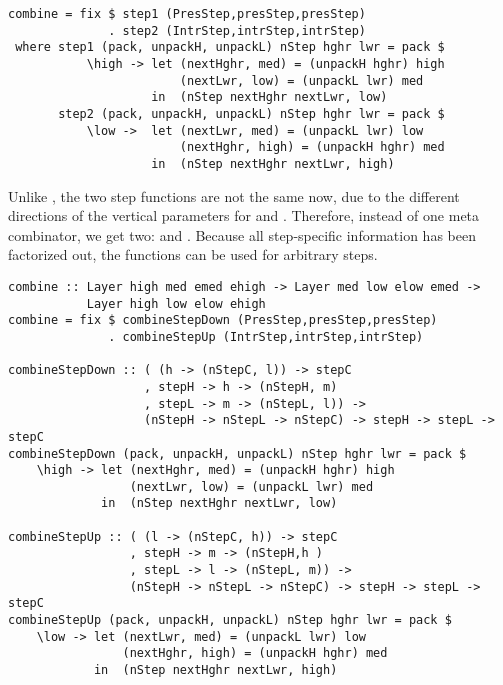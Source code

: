 \begin{small}
\begin{verbatim}
combine = fix $ step1 (PresStep,presStep,presStep) 
              . step2 (IntrStep,intrStep,intrStep) 
 where step1 (pack, unpackH, unpackL) nStep hghr lwr = pack $
           \high -> let (nextHghr, med) = (unpackH hghr) high
                        (nextLwr, low) = (unpackL lwr) med
                    in  (nStep nextHghr nextLwr, low)
       step2 (pack, unpackH, unpackL) nStep hghr lwr = pack $
           \low ->  let (nextLwr, med) = (unpackL lwr) low
                        (nextHghr, high) = (unpackH hghr) med
                    in  (nStep nextHghr nextLwr, high)
\end{verbatim}
\end{small}

Unlike , the two step functions are not the same now, due to the different directions of the vertical parameters for  and . Therefore, instead of one meta combinator, we get two:  and . Because all step-specific information has been factorized out, the functions can be used for arbitrary steps.

\begin{small}
\begin{verbatim}
combine :: Layer high med emed ehigh -> Layer med low elow emed -> 
           Layer high low elow ehigh
combine = fix $ combineStepDown (PresStep,presStep,presStep) 
              . combineStepUp (IntrStep,intrStep,intrStep) 

combineStepDown :: ( (h -> (nStepC, l)) -> stepC 
                   , stepH -> h -> (nStepH, m)
                   , stepL -> m -> (nStepL, l)) -> 
                   (nStepH -> nStepL -> nStepC) -> stepH -> stepL -> stepC
combineStepDown (pack, unpackH, unpackL) nStep hghr lwr = pack $
    \high -> let (nextHghr, med) = (unpackH hghr) high
                 (nextLwr, low) = (unpackL lwr) med
             in  (nStep nextHghr nextLwr, low)

combineStepUp :: ( (l -> (nStepC, h)) -> stepC 
                 , stepH -> m -> (nStepH,h )
                 , stepL -> l -> (nStepL, m)) -> 
                 (nStepH -> nStepL -> nStepC) -> stepH -> stepL -> stepC
combineStepUp (pack, unpackH, unpackL) nStep hghr lwr = pack $
    \low -> let (nextLwr, med) = (unpackL lwr) low
                (nextHghr, high) = (unpackH hghr) med
            in  (nStep nextHghr nextLwr, high)
\end{verbatim}
\end{small}

